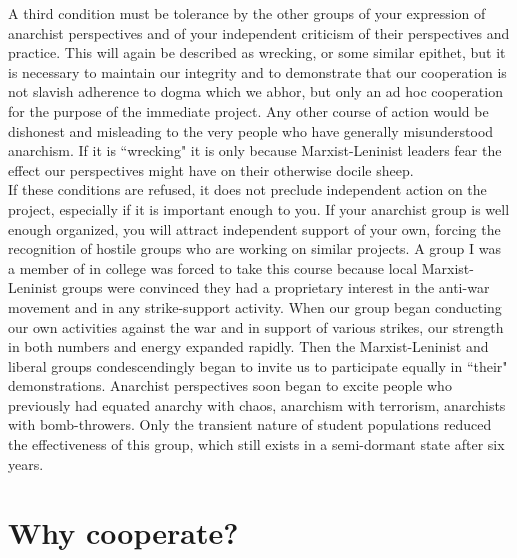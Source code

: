 \documentclass[12pt, onecolumn, letterpaper, oneside]{book}
\begin{document}
A third condition must be tolerance by the other groups of your expression of anarchist perspectives and of your independent criticism of their perspectives and practice. This will again be described as wrecking, or some similar epithet, but it is necessary to maintain our integrity and to demonstrate that our cooperation is not slavish adherence to dogma which we abhor, but only an ad hoc cooperation for the purpose of the immediate project. Any other course of action would be dishonest and misleading to the very people who have generally misunderstood anarchism. If it is ``wrecking" it is only because Marxist-Leninist leaders fear the effect our perspectives might have on their otherwise docile sheep.\\
If these conditions are refused, it does not preclude independent action on the project, especially if it is important enough to you. If your anarchist group is well enough organized, you will attract independent support of your own, forcing the recognition of hostile groups who are working on similar projects. A group I was a member of in college was forced to take this course because local Marxist-Leninist groups were convinced they had a proprietary interest in the anti-war movement and in any strike-support activity. When our group began conducting our own activities against the war and  in support of various strikes, our strength in both numbers and energy expanded rapidly. Then the Marxist-Leninist and liberal groups condescendingly began to invite us to participate equally in ``their" demonstrations. Anarchist perspectives soon began to excite people who previously had equated anarchy with chaos, anarchism with terrorism, anarchists with bomb-throwers. Only the transient nature of student populations reduced the effectiveness of this group, which still exists in a semi-dormant state after six years.

\section*{Why cooperate?}
\end{document}
